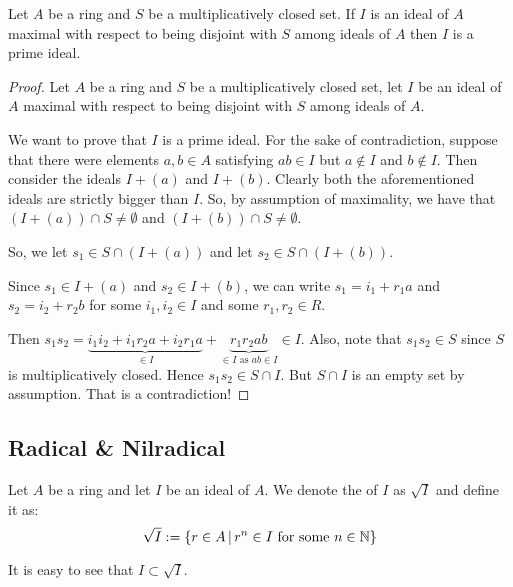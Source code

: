 \begin{theorem}
    Let $A$ be a ring and $S$ be a multiplicatively closed set. If $I$ is an ideal of $A$ maximal with respect to being disjoint with $S$ among ideals of $A$ then $I$ is a prime ideal.
    \label{thm:Krull}
\end{theorem}
\begin{proof}
    Let $A$ be a ring and $S$ be a multiplicatively closed set, let $I$ be an ideal of $A$ maximal with respect to being disjoint with $S$ among ideals of $A$.

    We want to prove that $I$ is a prime ideal. For the sake of contradiction, suppose that there were elements $a,b \in A$ satisfying $ab \in I$ but $a\not\in I$ and $b\not\in I$.
    Then consider the ideals $I+\left( a \right) $ and $I+\left( b \right)$. Clearly both the aforementioned ideals are strictly bigger than $I$. So, by assumption of maximality, we have that $\left( I + \left( a \right) \right) \cap S \ne \emptyset$ and $\left( I + \left( b \right) \right) \cap S \ne \emptyset$.

    So, we let $s_1 \in S \cap \left( I+ \left( a \right) \right)$ and let $s_2 \in S \cap \left( I + \left( b \right) \right)$.

    Since $s_1 \in I + \left( a \right)$ and $s_2 \in I + \left( b \right)$, we can write $s_1 = i_1 + r_1 a$ and $s_2 = i_2 + r_2 b$ for some $i_1, i_2 \in I$ and some $r_1 , r_2 \in R$.

    Then $s_1s_2 = \underbrace{i_1 i_2 + i_1 r_2 a + i_2 r_1 a}_{\in I} + \underbrace{r_1 r_2 ab}_{\in I \text{ as } ab \in I} \in I$. Also, note that $s_1 s_2 \in S$ since $S$ is multiplicatively closed. Hence $s_1 s_2 \in S\cap I$. But $S\cap I$ is an empty set by assumption. That is a contradiction!
\end{proof}

\subsection{Radical \& Nilradical}

\begin{definition}
    Let $A$ be a ring and let $I$ be an ideal of $A$. We denote the  of $I$ as $\sqrt{I}$ and define it as:
    $$\sqrt{I} := \left\{ r \in A \, | \, r^{n} \in I \text{ for some } n\in \mathbb N \right\}$$
    \label{def:radical}
\end{definition}
It is easy to see that $I \subset \sqrt{I}$.


